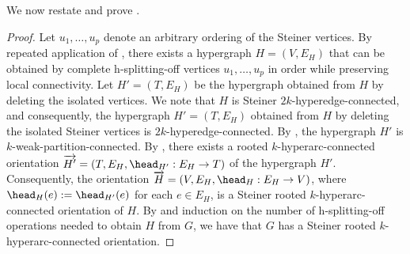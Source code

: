 We now restate and prove .

\thmRootedSteinerArcConnectedOrientationsHypergraphs*
\begin{proof}
    Let $u_1, \ldots, u_p$ denote an arbitrary ordering of the Steiner vertices. By repeated application of , there exists a hypergraph $H = (V, E_H)$ that can be obtained by complete h-splitting-off vertices $u_1, \ldots, u_p$ in order while preserving local connectivity. Let $H' = (T, E_H)$ be the hypergraph obtained from $H$ by deleting the isolated vertices. We note that $H$ is Steiner $2k$-hyperedge-connected, and consequently, the hypergraph $H' = (T, E_H)$ obtained from $H$ by deleting the isolated Steiner vertices is $2k$-hyperedge-connected. By , the hypergraph $H'$ is $k$-weak-partition-connected. By , there exists a rooted $k$-hyperarc-connected orientation $\overrightarrow{H'} = (T, E_{H}, \head_{H'}:E_H \rightarrow T)$ of the hypergraph $H'$. Consequently, the orientation $\overrightarrow{H} = (V, E_H, \head_H:E_H \rightarrow V)$, where $\head_H(e) := \head_{H'}(e)$ for each $e \in E_H$, is a Steiner rooted $k$-hyperarc-connected orientation of $H$. By  and induction on the number of h-splitting-off operations needed to obtain $H$ from $G$, we have that $G$ has a Steiner rooted $k$-hyperarc-connected orientation.
\end{proof}

